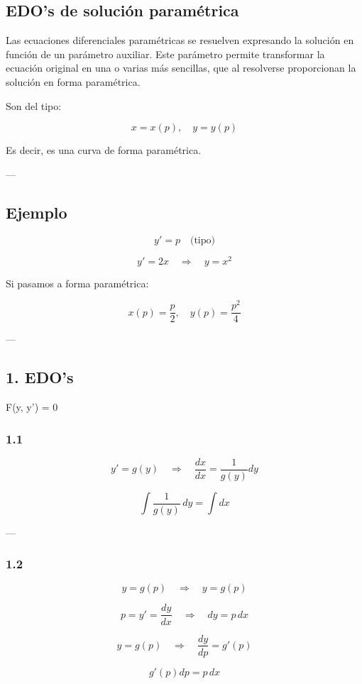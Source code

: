 \documentclass[a4paper,12pt]{article}
\begin{document}
\subsection{EDO's de solución paramétrica}
\noindent
Las ecuaciones diferenciales paramétricas se resuelven expresando 
la solución en función de un parámetro auxiliar. Este parámetro 
permite transformar la ecuación original en una o varias más sencillas, 
que al resolverse proporcionan la solución en forma paramétrica.

\medskip
\noindent
Son del tipo:

\[
x = x(p), \quad y = y(p)
\]

Es decir, es una curva de forma paramétrica.

---

\subsection*{Ejemplo}

\[
y' = p \quad \text{(tipo)}
\]

\[
y' = 2x \quad \Rightarrow \quad y = x^2
\]

Si pasamos a forma paramétrica:

\[
x(p) = \frac{p}{2}, \quad y(p) = \frac{p^2}{4}
\]

---

\subsection*{1. EDO's } F(y, y') = 0

\subsubsection*{1.1}
\[
y' = g(y) \quad \Rightarrow \quad \frac{dx}{dx} = \frac{1}{g(y)} dy
\]

\[
\int \frac{1}{g(y)}\, dy = \int dx
\]

---

\subsubsection*{1.2}
\[
y = g(p) \quad \Rightarrow \quad y = g(p)
\]

\[
p = y' = \frac{dy}{dx} \quad \Rightarrow \quad dy = p\, dx
\]

\[
y = g(p) \quad \Rightarrow \quad \frac{dy}{dp} = g'(p)
\]

\[
g'(p) dp = p\, dx
\]
\end{document}
